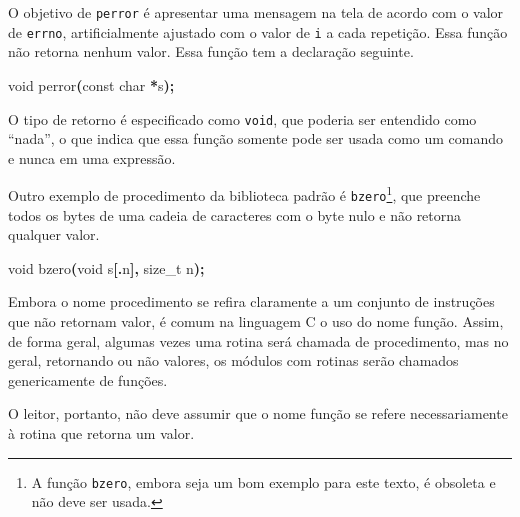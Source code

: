 \documentclass[
  11pt,
  a4paper,
]{scrbook}
\newenvironment{Shaded}{\begin{snugshade}}{\end{snugshade}}
\newcommand{\DataTypeTok}[1]{\textcolor[rgb]{0.13,0.29,0.53}{#1}}
\newcommand{\NormalTok}[1]{#1}
\newcommand{\OperatorTok}[1]{\textcolor[rgb]{0.81,0.36,0.00}{\textbf{#1}}}
\begin{document}
O objetivo de \texttt{perror} é apresentar uma mensagem na tela de
acordo com o valor de \texttt{errno}, artificialmente ajustado com o
valor de \texttt{i} a cada repetição. Essa função não retorna nenhum
valor. Essa função tem a declaração seguinte.

\begin{Shaded}
\begin{Highlighting}[]
\DataTypeTok{void}\NormalTok{ perror}\OperatorTok{(}\DataTypeTok{const} \DataTypeTok{char} \OperatorTok{*}\NormalTok{s}\OperatorTok{);}
\end{Highlighting}
\end{Shaded}

O tipo de retorno é especificado como \texttt{void}, que poderia ser
entendido como ``nada'', o que indica que essa função somente pode ser
usada como um comando e nunca em uma expressão.

Outro exemplo de procedimento da biblioteca padrão é
\texttt{bzero}\footnote{A função \texttt{bzero}, embora seja um bom
  exemplo para este texto, é obsoleta e não deve ser usada.}, que
preenche todos os bytes de uma cadeia de caracteres com o byte nulo e
não retorna qualquer valor.

\begin{Shaded}
\begin{Highlighting}[]
\DataTypeTok{void}\NormalTok{ bzero}\OperatorTok{(}\DataTypeTok{void}\NormalTok{ s}\OperatorTok{[.}\NormalTok{n}\OperatorTok{],} \DataTypeTok{size\_t}\NormalTok{ n}\OperatorTok{);}
\end{Highlighting}
\end{Shaded}

\begin{tcolorbox}[enhanced jigsaw, arc=.35mm, bottomtitle=1mm, colbacktitle=quarto-callout-note-color!10!white, title=\textcolor{quarto-callout-note-color}{\faInfo}\hspace{0.5em}{Nota}, toprule=.15mm, left=2mm, opacityback=0, colback=white, colframe=quarto-callout-note-color-frame, opacitybacktitle=0.6, bottomrule=.15mm, leftrule=.75mm, toptitle=1mm, coltitle=black, titlerule=0mm, rightrule=.15mm, breakable]

Embora o nome procedimento se refira claramente a um conjunto de
instruções que não retornam valor, é comum na linguagem C o uso do nome
função. Assim, de forma geral, algumas vezes uma rotina será chamada de
procedimento, mas no geral, retornando ou não valores, os módulos com
rotinas serão chamados genericamente de funções.

O leitor, portanto, não deve assumir que o nome função se refere
necessariamente à rotina que retorna um valor.

\end{tcolorbox}
\end{document}
